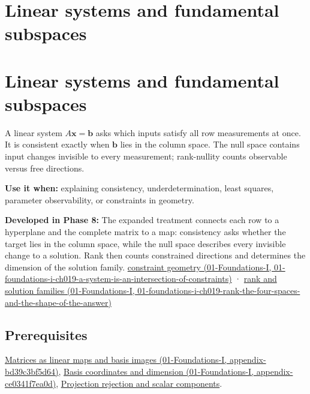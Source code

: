 \hypertarget{appendix-8572a4a060c1}{}
\section*{Linear systems and fundamental subspaces}
\section{Linear systems and fundamental subspaces}\label{appendix-8572a4a060c1-linear-systems-and-fundamental-subspaces}

A linear system \(A\mathbf x=\mathbf b\) asks which inputs satisfy all row measurements at once. It is consistent exactly when \(\mathbf b\) lies in the column space. The null space contains input changes invisible to every measurement; rank-nullity counts observable versus free directions.

\textbf{Use it when:} explaining consistency, underdetermination, least squares, parameter observability, or constraints in geometry.

\textbf{Developed in Phase 8:} The expanded treatment connects each row to a hyperplane and the complete matrix to a map: consistency asks whether the target lies in the column space, while the null space describes every invisible change to a solution. Rank then counts constrained directions and determines the dimension of the solution family. \href{../01-Foundations-I/main.pdf\#nameddest=01-foundations-i-ch019-a-system-is-an-intersection-of-constraints}{constraint geometry (01-Foundations-I, 01-foundations-i-ch019-a-system-is-an-intersection-of-constraints)} · \href{../01-Foundations-I/main.pdf\#nameddest=01-foundations-i-ch019-rank-the-four-spaces-and-the-shape-of-the-answer}{rank and solution families (01-Foundations-I, 01-foundations-i-ch019-rank-the-four-spaces-and-the-shape-of-the-answer)}

\subsection{Prerequisites}\label{appendix-8572a4a060c1-prerequisites}

\href{../01-Foundations-I/main.pdf\#nameddest=appendix-bd39c3bf5d64}{Matrices as linear maps and basis images (01-Foundations-I, appendix-bd39c3bf5d64)}, \href{../01-Foundations-I/main.pdf\#nameddest=appendix-ce0341f7ea0d}{Basis coordinates and dimension (01-Foundations-I, appendix-ce0341f7ea0d)}, \hyperref[appendix-505a502c372a]{Projection rejection and scalar components}.


